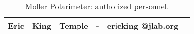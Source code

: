 \begin{safetyen}{0}{0}
\begin{table}[ht]
\begin{center}
\begin{tabular}{|ll|c|l|l|c|}
  Eric & King  & Temple   & - & ericking @jlab.org      &     \\
\hline
\end{tabular}
\end{center}
\caption[Moller Polarimeter: authorized personnel]{
   Moller Polarimeter: authorized personnel.
}
\label{Tab2}
\end{table}
\end{safetyen}
